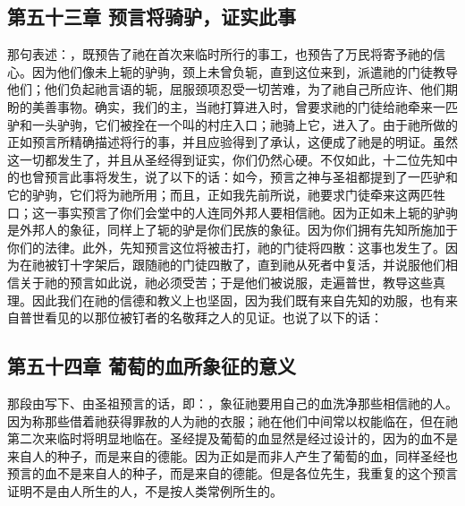 
\subsection{第五十三章 预言将骑驴，证实此事}

那句表述：，既预告了祂在首次来临时所行的事工，也预告了万民将寄予祂的信心。因为他们像未上轭的驴驹，颈上未曾负轭，直到这位来到，派遣祂的门徒教导他们；他们负起祂言语的轭，屈服颈项忍受一切苦难，为了祂自己所应许、他们期盼的美善事物。确实，我们的主，当祂打算进入时，曾要求祂的门徒给祂牵来一匹驴和一头驴驹，它们被拴在一个叫的村庄入口；祂骑上它，进入了。由于祂所做的正如预言所精确描述将行的事，并且应验得到了承认，这便成了祂是的明证。虽然这一切都发生了，并且从圣经得到证实，你们仍然心硬。不仅如此，十二位先知中的也曾预言此事将发生，说了以下的话：如今，预言之神与圣祖都提到了一匹驴和它的驴驹，它们将为祂所用；而且，正如我先前所说，祂要求门徒牵来这两匹牲口；这一事实预言了你们会堂中的人连同外邦人要相信祂。因为正如未上轭的驴驹是外邦人的象征，同样上了轭的驴是你们民族的象征。因为你们拥有先知所施加于你们的法律。此外，先知预言这位将被击打，祂的门徒将四散：这事也发生了。因为在祂被钉十字架后，跟随祂的门徒四散了，直到祂从死者中复活，并说服他们相信关于祂的预言如此说，祂必须受苦；于是他们被说服，走遍普世，教导这些真理。因此我们在祂的信德和教义上也坚固，因为我们既有来自先知的劝服，也有来自普世看见的以那位被钉者的名敬拜之人的见证。也说了以下的话：\par


\subsection{第五十四章 葡萄的血所象征的意义}

那段由写下、由圣祖预言的话，即：，象征祂要用自己的血洗净那些相信祂的人。因为称那些借着祂获得罪赦的人为祂的衣服；祂在他们中间常以权能临在，但在祂第二次来临时将明显地临在。圣经提及葡萄的血显然是经过设计的，因为的血不是来自人的种子，而是来自的德能。因为正如是而非人产生了葡萄的血，同样圣经也预言的血不是来自人的种子，而是来自的德能。但是各位先生，我重复的这个预言证明不是由人所生的人，不是按人类常例所生的。\par

